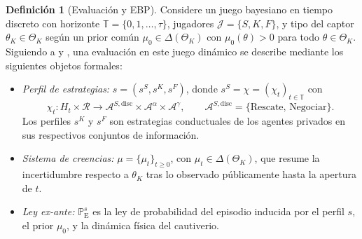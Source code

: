 \documentclass[review,authoryear,12pt]{elsarticle}
\providecommand{\textcite}{\citet}
\theoremstyle{plain}
\theoremstyle{definition}
\newtheorem{definition}[theorem]{Definición}
\newcommand{\ProbE}{\mathbb{P}_{\mathrm{E}}}
\newcommand{\ThetaK}{\Theta_K}
\newcommand{\1}{\mathbf{1}}
\begin{document}
\begin{definition}[Evaluación y EBP]
\label{def:pbe-mechanism}
Considere un juego bayesiano en tiempo discreto con horizonte $\mathbb{T}=\{0,1,\ldots,\tau\}$, jugadores $\mathcal{J}=\{S,K,F\}$, y tipo del captor $\theta_K\in\ThetaK$ según un prior común $\mu_0\in\Delta(\ThetaK)$ con $\mu_0(\theta)>0$ para todo $\theta\in\ThetaK$. Siguiendo a \textcite{FudenbergTirole1991} y \textcite{KrepsWilson1982}, una evaluación en este juego dinámico se describe mediante los siguientes objetos formales:

\begin{itemize}
  \item \emph{Perfil de estrategias:} $s=(s^S,s^K,s^F)$, donde $s^S=\chi=(\chi_t)_{t\in\mathbb{T}}$ con
  \[
    \chi_t \colon H_t\times\mathcal{R}
    \longrightarrow \mathcal{A}^{S,\mathrm{disc}}\times\mathcal{A}^{\alpha}\times\mathcal{A}^{\gamma},
    \qquad
    \mathcal{A}^{S,\mathrm{disc}}=\{\text{Rescate},\,\text{Negociar}\}.
  \]
  Los perfiles $s^K$ y $s^F$ son estrategias conductuales de los agentes privados en sus respectivos conjuntos de información.
  \item \emph{Sistema de creencias:} $\mu=\{\mu_t\}_{t\ge 0}$, con $\mu_t\in\Delta(\ThetaK)$, que resume la incertidumbre respecto a $\theta_K$ tras lo observado públicamente hasta la apertura de $t$.
  \item \emph{Ley ex-ante:} $\ProbE^s$ es la ley de probabilidad del episodio inducida por el perfil $s$, el prior $\mu_0$, y la dinámica física del cautiverio.
\end{itemize}


\end{definition}
\end{document}
